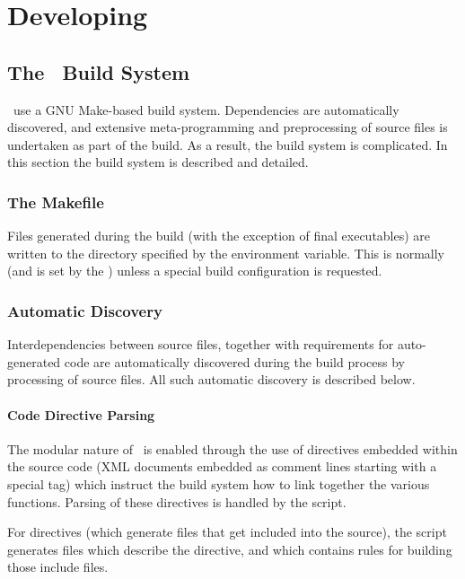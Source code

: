 \chapter{Developing \glc}\label{sec:development}

\section{The \glc\ Build System}

\glc\ use a GNU Make-based build system. Dependencies are automatically discovered, and extensive meta-programming and preprocessing of source files is undertaken as part of the build. As a result, the build system is complicated. In this section the build system is described and detailed.

\subsection{The Makefile}

Files generated during the build (with the exception of final executables) are written to the directory specified by the  environment variable. This is normally  (and is set by the ) unless a special build configuration is requested.

\subsection{Automatic Discovery}

Interdependencies between source files, together with requirements for auto-generated code are automatically discovered during the build process by processing of source files. All such automatic discovery is described below.

\subsubsection{Code Directive Parsing}\label{sec:buildDiscoveryDirectives}

The modular nature of \glc\ is enabled through the use of directives embedded within the source code (XML documents embedded as comment lines starting with a special tag) which instruct the build system how to link together the various functions. Parsing of these directives is handled by the  script.

For  directives (which generate files that get included into the source), the script generates  files which describe the directive, and  which contains rules for building those include files.

